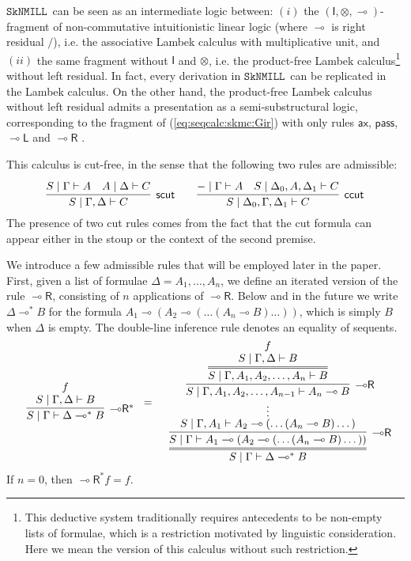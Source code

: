 \documentclass[sn-mathphys-num]{sn-jnl}%
\newcommand{\GG}{\Gamma}
\newcommand{\GD}{\Delta}
\newcommand{\vd}{\vdash}
\newcommand{\pass}{\mathsf{pass}}
\newcommand{\ax}{\mathsf{ax}}
\newcommand{\ot}{\otimes}
\newcommand{\lolli}{\multimap}
\newcommand{\lleft}{{\lolli}\mathsf{L}}
\newcommand{\lright}{{\lolli}\mathsf{R}}
\newcommand{\unit}{\mathsf{I}}
\newcommand{\sls}{\slash}
\newcommand{\proofbox}[1]{\begin{tabular}{l} #1 \end{tabular}}
\newcommand{\SkNMILL}{$\mathtt{SkNMILL}$}
\newcommand{\niccolo}[1]{\textcolor{red}{NV: #1}}
\theoremstyle{thmstyleone}%
\theoremstyle{thmstyletwo}%
\theoremstyle{thmstylethree}%
\begin{document}
\SkNMILL~can be seen as an intermediate logic between: $(i)$ the $(\unit,\ot,\lolli)$-fragment of non-commutative intuitionistic linear logic (where $\lolli$ is right residual $\sls$), i.e. the associative Lambek calculus with multiplicative unit, and $(ii)$ the same fragment without $\unit$ and $\ot$, i.e. the product-free Lambek calculus\footnote{This deductive system traditionally requires antecedents to be non-empty lists of formulae, which is a restriction motivated by linguistic consideration. Here we mean the version of this calculus without such restriction.} without left residual.
In fact, every derivation in \SkNMILL~can be replicated in the Lambek calculus.
On the other hand, the product-free Lambek calculus without left residual admits a presentation as a semi-substructural logic, corresponding to the fragment of (\ref{eq:seqcalc:skmc:Gir}) with only rules $\ax$, $\pass$, $\lleft$ and $\lright$ \cite{uustalu:deductive:nodate}.


This calculus is cut-free, in the sense that the following two rules are admissible:
\begin{equation}\label{eq:cut}
  \infer[\mathsf{scut}]{S \mid \GG , \GD \vd C}{
  \deduce{S \mid \GG \vd A}{}
  &
  \deduce{A \mid \GD \vd C}{}
  }
  \qquad
  \infer[\mathsf{ccut}]{S \mid \GD_0 , \GG , \GD_1 \vd C}{
  \deduce{{-} \mid \GG \vd A}{}
  &
  \deduce{S \mid \GD_0 , A , \GD_1 \vd C}{}
  }
\end{equation}
The presence of two cut rules comes from the fact that the cut formula can appear either in the stoup or the context of the second premise.


We introduce a few admissible rules that will be employed later in the paper.
First, given a list of formulae $\GD = A_1,\dots,A_n$, we define an iterated version of the rule $\lright$, consisting of $n$ applications of $\lright$. Below and in the future we write $\GD \lolli^* B$ for the formula $A_1 \lolli (A_2 \lolli (\dots (A_n \lolli B) \dots ))$, which is simply $B$ when $\GD$ is empty. The double-line inference rule denotes an equality of sequents.
\begin{equation}\label{-oR*}
  \begin{array}{l}
    \proofbox{\infer[\lright^*]{S \mid \GG \vd \GD \lolli^* B}{
    \deduce{S \mid \GG , \GD \vd B}{f}
    }}
    =
    \proofbox{
    \infer={S \mid \GG \vd \GD \lolli^* B}{
    \infer[\lright]{S \mid \GG \vd A_1 \lolli (A_2 \lolli (\dots (A_n \lolli B) \dots ))}{
    \deduce[\vdots]{S \mid \GG, A_1 \vd A_2 \lolli (\dots (A_n \lolli B) \dots )}{
    \infer[\lright]{S \mid \GG , A_1, A_2, \dots, A_{n-1} \vd A_n \lolli B}{
    \infer={S \mid \GG , A_1, A_2, \dots, A_n \vd B}{
    \deduce{S \mid \GG , \GD \vd B}{f}
    }
    }
    }
    }
    }
    }
  \end{array}
\end{equation}
If $n = 0$, then $\lright^* f = f$.
\end{document}
